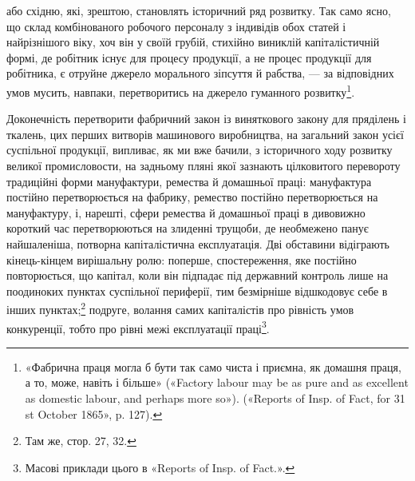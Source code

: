 або східню, які, зрештою, становлять історичний ряд
розвитку. Так само ясно, що склад комбінованого робочого персоналу
з індивідів обох статей і найрізнішого віку, хоч він у своїй
грубій, стихійно виниклій капіталістичній формі, де робітник
існує для процесу продукції, а не процес продукції для робітника,
є отруйне джерело морального зіпсуття й рабства, — за відповідних
умов мусить, навпаки, перетворитись на джерело гуманного
розвитку\footnote{
«Фабрична праця могла б бути так само чиста і приємна, як домашня
праця, а то, може, навіть і більше» («Factory labour may be as
pure and as excellent as domestic labour, and perhaps more so»). («Reports
of Insp. of Fact, for 31 st October 1865», p. 127).
}.

Доконечність перетворити фабричний закон із виняткового
закону для пряділень і ткалень, цих перших витворів машинового
виробництва, на загальний закон усієї суспільної продукції, випливає,
як ми вже бачили, з історичного ходу розвитку великої промисловости,
на задньому пляні якої зазнають цілковитого перевороту
традиційні форми мануфактури, ремества й домашньої
праці: мануфактура постійно перетворюється на фабрику, ремество
постійно перетворюється на мануфактуру, і, нарешті,
сфери ремества й домашньої праці в дивовижно короткий час
перетворюються на злиденні трущоби, де необмежено панує найшаленіша,
потворна капіталістична експлуатація. Дві обставини
відіграють кінець-кінцем вирішальну ролю: поперше, спостереження,
яке постійно повторюється, що капітал, коли він підпадає
під державний контроль лише на поодиноких пунктах
суспільної периферії, тим безмірніше відшкодовує себе в інших
пунктах;\footnote{
Там же, стор. 27, 32.
} подруге, волання самих капіталістів про рівність
умов конкуренції, тобто про рівні межі експлуатації праці\footnote{
Масові приклади цього в «Reports of Insp. of Fact.».
}.
\parbreak{}  %
